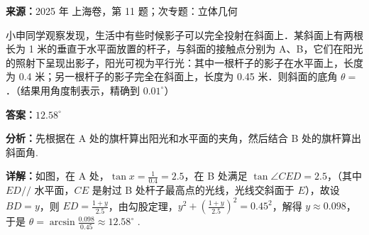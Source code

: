 \begin{question}[points=5]
\textbf{来源：}2025 年 上海卷，第 11 题；次专题：立体几何\par
小申同学观察发现，生活中有些时候影子可以完全投射在斜面上．某斜面上有两根长为 1 米的垂直于水平面放置的杆子，与斜面的接触点分别为 A、B，它们在阳光的照射下呈现出影子，阳光可视为平行光：其中一根杆子的影子在水平面上，长度为 0.4 米；另一根杆子的影子完全在斜面上，长度为 0.45 米．则斜面的底角 $\theta =$ ．（结果用角度制表示，精确到 $0.01^\circ$）
\fillin[{$12.58^\circ$}]
\begin{solution}
\textbf{答案：}$12.58^\circ$

\textbf{分析：}先根据在 A 处的旗杆算出阳光和水平面的夹角，然后结合 B 处的旗杆算出斜面角.

\textbf{详解：}如图，在 A 处，$\tan x = \frac{1}{0.4} = 2.5$，在 B 处满足 $\tan \angle CED = 2.5$，（其中 $ED //$ 水平面，$CE$ 是射过 B 处杆子最高点的光线，光线交斜面于 $E$），故设 $BD = y$，则 $ED = \frac{1+y}{2.5}$，由勾股定理，$y^2 + \left(\frac{1+y}{2.5}\right)^2 = 0.45^2$，解得 $y \approx 0.098$，于是 $\theta = \arcsin\frac{0.098}{0.45} \approx 12.58^\circ$ .
\end{solution}
\end{question}


